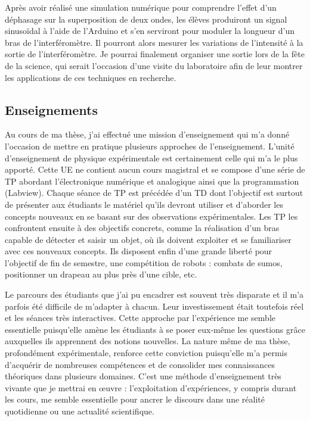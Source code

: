 \documentclass[12pt,a4paper]{article}
\begin{document}
Après avoir réalisé une simulation numérique pour comprendre l'effet d'un déphasage sur la superposition de deux ondes, les élèves produiront un signal sinusoïdal à l'aide de l'Arduino et s'en serviront pour moduler la longueur d'un bras de l'interféromètre.
Il pourront alors mesurer les variations de l'intensité à la sortie de l'interféromètre.
Je pourrai finalement organiser une sortie lors de la fête de la science, qui serait l'occasion d'une visite du laboratoire afin de leur montrer les applications de ces techniques en recherche.

\subsection{Enseignements}

Au cours de ma thèse, j'ai effectué une mission d'enseignement qui m'a donné l'occasion de mettre en pratique plusieurs approches de l'enseignement.
L'unité d'enseignement de physique expérimentale est certainement celle qui m'a le plus apporté.
Cette UE ne contient aucun cours magistral et se compose d'une série de TP abordant l'électronique numérique et analogique ainsi que la programmation (Labview).
Chaque séance de TP est précédée d'un TD dont l'objectif est surtout de présenter aux étudiants le matériel qu'ils devront utiliser et d'aborder les concepts nouveaux en se basant sur des observations expérimentales.
Les TP les confrontent ensuite à des objectifs concrets, comme la réalisation d'un bras capable de détecter et saisir un objet, où ils doivent exploiter et se familiariser avec ces nouveaux concepts.
Ils disposent enfin d'une grande liberté pour l'objectif de fin de semestre, une compétition de robots : combats de \og sumos\fg{}, positionner un drapeau au plus près d'une cible, etc.

Le parcours des étudiants que j'ai pu encadrer est souvent très disparate et il m'a parfois été difficile de m'adapter à chacun.
Leur investissement était toutefois réel et les séances très interactives.
Cette approche par l'expérience me semble essentielle puisqu'elle amène les étudiants à se poser eux-même les questions grâce auxquelles ils apprennent des notions nouvelles.
La nature même de ma thèse, profondément expérimentale, renforce cette conviction puisqu'elle m'a permis d'acquérir de nombreuses compétences et de consolider mes connaissances théoriques dans plusieurs domaines.
C'est une méthode d'enseignement très vivante que je mettrai en œuvre : l'exploitation d'expériences, y compris durant les cours, me semble essentielle pour ancrer le discours dans une réalité quotidienne ou une actualité scientifique.
\end{document}
